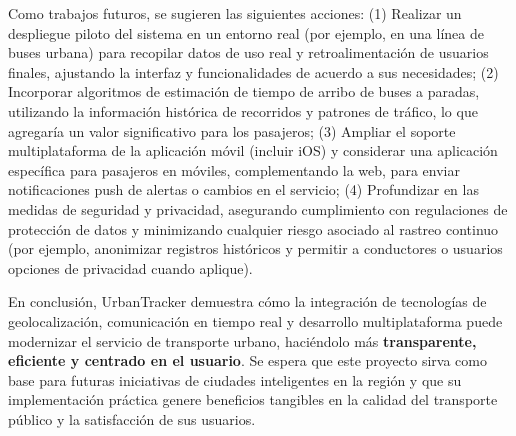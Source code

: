 Como trabajos futuros, se sugieren las siguientes acciones: (1) Realizar un despliegue piloto del sistema en un entorno real (por ejemplo, en una línea de buses urbana) para recopilar datos de uso real y retroalimentación de usuarios finales, ajustando la interfaz y funcionalidades de acuerdo a sus necesidades; (2) Incorporar algoritmos de estimación de tiempo de arribo de buses a paradas, utilizando la información histórica de recorridos y patrones de tráfico, lo que agregaría un valor significativo para los pasajeros; (3) Ampliar el soporte multiplataforma de la aplicación móvil (incluir iOS) y considerar una aplicación específica para pasajeros en móviles, complementando la web, para enviar notificaciones push de alertas o cambios en el servicio; (4) Profundizar en las medidas de seguridad y privacidad, asegurando cumplimiento con regulaciones de protección de datos y minimizando cualquier riesgo asociado al rastreo continuo (por ejemplo, anonimizar registros históricos y permitir a conductores o usuarios opciones de privacidad cuando aplique).

En conclusión, UrbanTracker demuestra cómo la integración de tecnologías de geolocalización, comunicación en tiempo real y desarrollo multiplataforma puede modernizar el servicio de transporte urbano, haciéndolo más \textbf{transparente, eficiente y centrado en el usuario}. Se espera que este proyecto sirva como base para futuras iniciativas de ciudades inteligentes en la región y que su implementación práctica genere beneficios tangibles en la calidad del transporte público y la satisfacción de sus usuarios.
